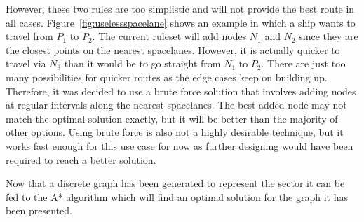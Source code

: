 However, these two rules are too simplistic and will not provide the best route in all cases. Figure~\ref{fig:uselessspacelane} shows an example in which a ship wants to travel from $P_1$ to $P_2$. The current ruleset will add nodes $N_1$ and $N_2$ since they are the closest points on the nearest spacelanes. However, it is actually quicker to travel via $N_3$ than it would be to go straight from $N_1$ to $P_2$. There are just too many possibilities for quicker routes as the edge cases keep on building up. Therefore, it was decided to use a brute force solution that involves adding nodes at regular intervals along the nearest spacelanes. The best added node may not match the optimal solution exactly, but it will be better than the majority of other options. Using brute force is also not a highly desirable technique, but it works fast enough for this use case for now as further designing would have been required to reach a better solution.

Now that a discrete graph has been generated to represent the sector it can be fed to the A* algorithm which will find an optimal solution for the graph it has been presented.
